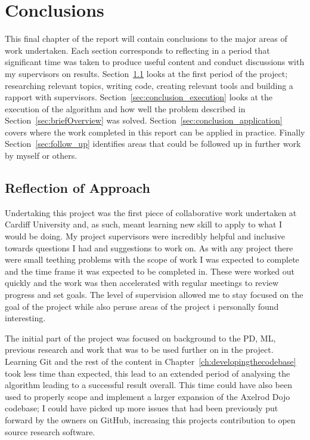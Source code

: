\chapter{Conclusions}\label{ch:conclusions}
This final chapter of the report will contain conclusions to the major areas of work undertaken.
Each section corresponds to reflecting in a period that significant time was taken to produce useful content and conduct discussions with my supervisors on results.
Section~\ref{sec:conclusion_approach} looks at the first period of the project; researching relevant topics,  writing code, creating relevant tools and building a rapport with supervisors.
Section~\ref{sec:conclusion_execution} looks at the execution of the algorithm and how well the problem described in Section~\ref{sec:briefOverview} was solved.
Section~\ref{sec:conclusion_application} covers where the work completed in this report can be applied in practice.
Finally Section~\ref{sec:follow_up} identifies areas that could be followed up in further work by myself or others.

\section{Reflection of Approach}\label{sec:conclusion_approach}
Undertaking this project was the first piece of collaborative work undertaken at Cardiff University and, as such, meant learning new skill to apply to what I would be doing.
My project supervisors were incredibly helpful and inclusive towards questions I had and suggestions to work on.
As with any project there were small teething problems with the scope of work I was expected to complete and the time frame it was expected to be completed in.
These were worked out quickly and the work was then accelerated with regular meetings to review progress and set goals.
The level of supervision allowed me to stay focused on the goal of the project while also peruse areas of the project i personally found interesting.

The initial part of the project was focused on background to the PD, ML, previous research and work that was to be used further on in the project. 
Learning Git and the rest of the content in Chapter~\ref{ch:developingthecodebase} took less time than expected, this lead to an extended period of analysing the algorithm leading to a successful result overall. 
This time could have also been used to properly scope and implement a larger expansion of the Axelrod Dojo codebase; I could have picked up more issues that had been previously put forward by the owners on GitHub, increasing this projects contribution to open source research software.

